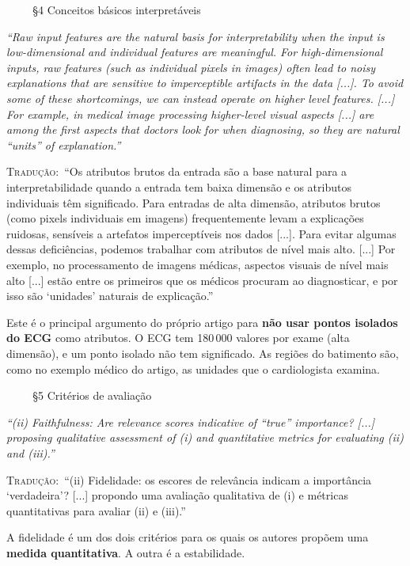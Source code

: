 \documentclass[11pt,a4paper]{article}
\newcommand{\pagechip}[1]{{\setlength{\fboxsep}{1.5pt}\colorbox{cAcc}{\textcolor{white}{\scriptsize\texttt{#1}}}}}
\newenvironment{origquote}{\par\itshape\small}{\par}
\newenvironment{tradquote}{\par\small\textsc{Tradução:}\ }{\par}
\newcommand{\explab}[1]{\par\smallskip{\small\color{cAcc}\textbf{\MakeUppercase{#1}}}\par}
\begin{document}
\begin{citacard}{\pagechip{p. 4} §4 Conceitos básicos interpretáveis}
\begin{origquote}“Raw input features are the natural basis for interpretability when the input is low-dimensional and individual features are meaningful. For high-dimensional inputs, raw features (such as individual pixels in images) often lead to noisy explanations that are sensitive to imperceptible artifacts in the data [...]. To avoid some of these shortcomings, we can instead operate on higher level features. [...] For example, in medical image processing higher-level visual aspects [...] are among the first aspects that doctors look for when diagnosing, so they are natural “units” of explanation.”\end{origquote}
\begin{tradquote}“Os atributos brutos da entrada são a base natural para a interpretabilidade quando a entrada tem baixa dimensão e os atributos individuais têm significado. Para entradas de alta dimensão, atributos brutos (como pixels individuais em imagens) frequentemente levam a explicações ruidosas, sensíveis a artefatos imperceptíveis nos dados [...]. Para evitar algumas dessas deficiências, podemos trabalhar com atributos de nível mais alto. [...] Por exemplo, no processamento de imagens médicas, aspectos visuais de nível mais alto [...] estão entre os primeiros que os médicos procuram ao diagnosticar, e por isso são ‘unidades’ naturais de explicação.”\end{tradquote}
\explab{Explicação: trecho-chave para o TCC}
Este é o principal argumento do próprio artigo para \textbf{não usar pontos isolados do ECG} como atributos. O ECG tem 180\,000 valores por exame (alta dimensão), e um ponto isolado não tem significado. As regiões do batimento são, como no exemplo médico do artigo, as unidades que o cardiologista examina.
\end{citacard}

\begin{citacard}{\pagechip{p. 5} §5 Critérios de avaliação}
\begin{origquote}“(ii) Faithfulness: Are relevance scores indicative of “true” importance? [...] proposing qualitative assessment of (i) and quantitative metrics for evaluating (ii) and (iii).”\end{origquote}
\begin{tradquote}“(ii) Fidelidade: os escores de relevância indicam a importância ‘verdadeira’? [...] propondo uma avaliação qualitativa de (i) e métricas quantitativas para avaliar (ii) e (iii).”\end{tradquote}
\explab{Explicação}
A fidelidade é um dos dois critérios para os quais os autores propõem uma \textbf{medida quantitativa}. A outra é a estabilidade.
\end{citacard}
\end{document}
